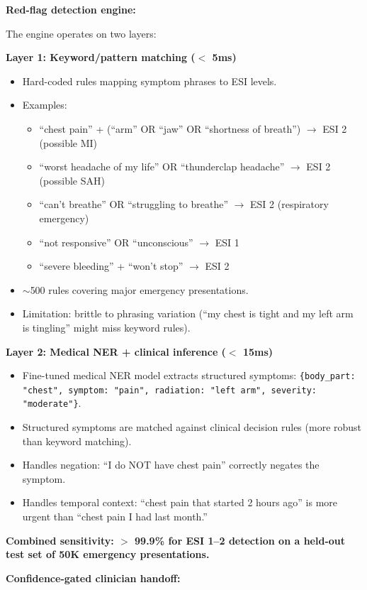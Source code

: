 \bigskip
\textbf{Red-flag detection engine:}

The engine operates on two layers:

\textbf{Layer 1: Keyword/pattern matching ($<$ 5ms)}
\begin{itemize}
  \item Hard-coded rules mapping symptom phrases to ESI levels.
  \item Examples:
  \begin{itemize}
    \item ``chest pain'' + (``arm'' OR ``jaw'' OR ``shortness of breath'') $\rightarrow$ ESI 2 (possible MI)
    \item ``worst headache of my life'' OR ``thunderclap headache'' $\rightarrow$ ESI 2 (possible SAH)
    \item ``can't breathe'' OR ``struggling to breathe'' $\rightarrow$ ESI 2 (respiratory emergency)
    \item ``not responsive'' OR ``unconscious'' $\rightarrow$ ESI 1
    \item ``severe bleeding'' + ``won't stop'' $\rightarrow$ ESI 2
  \end{itemize}
  \item $\sim$500 rules covering major emergency presentations.
  \item Limitation: brittle to phrasing variation (``my chest is tight and my left arm is tingling'' might miss keyword rules).
\end{itemize}

\textbf{Layer 2: Medical NER + clinical inference ($<$ 15ms)}
\begin{itemize}
  \item Fine-tuned medical NER model extracts structured symptoms: \texttt{\{body\_part: "chest", symptom: "pain", radiation: "left arm", severity: "moderate"\}}.
  \item Structured symptoms are matched against clinical decision rules (more robust than keyword matching).
  \item Handles negation: ``I do NOT have chest pain'' correctly negates the symptom.
  \item Handles temporal context: ``chest pain that started 2 hours ago'' is more urgent than ``chest pain I had last month.''
\end{itemize}

\textbf{Combined sensitivity: $>$ 99.9\% for ESI 1--2 detection on a held-out test set of 50K emergency presentations.}

\textbf{Confidence-gated clinician handoff:}

